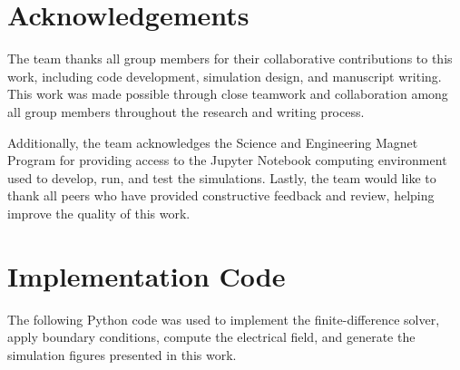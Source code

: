 \documentclass[reprint,amsmath,amssymb,aps]{revtex4-2}
\begin{document}
\section{Acknowledgements} 

The team thanks all group members for their collaborative contributions to this work, including code development, simulation design, and manuscript writing. This work was made possible through close teamwork and collaboration among all group members throughout the research and writing process. 

Additionally, the team acknowledges the Science and Engineering Magnet Program for providing access to the Jupyter Notebook computing environment used to develop, run, and test the simulations. Lastly, the team would like to thank all peers who have provided constructive feedback and review, helping improve the quality of this work. 

\appendix
\section{Implementation Code}
The following Python code was used to implement the finite-difference solver, apply boundary conditions, compute the electrical field, and generate the simulation figures presented in this work.
\end{document}
